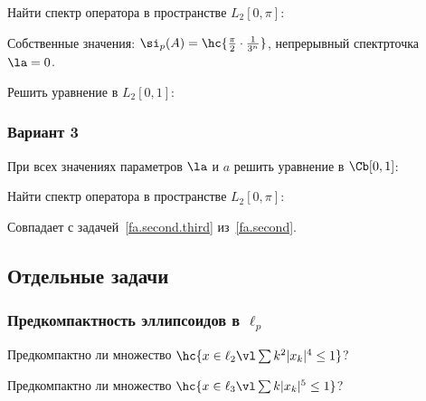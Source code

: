 \documentclass[a4paper]{article}
\begin{document}
\begin{problem}
Найти спектр оператора в пространстве $L_2[0,\pi]$:
\end{problem}
\begin{answer}
Собственные значения: $\si_p(A) = \hc{\frac\pi2\cdot \frac{1}{3^n}}$, непрерывный спектр\т точка $\la = 0$.
\end{answer}
\begin{problem}\label{fa.second.third}
Решить уравнение в $L_2[0,1]$:
\end{problem}


\subsubsection{Вариант 3}
\setcounter{problem}{0}
\begin{problem}
При всех значениях параметров $\la$ и $a$ решить уравнение в $\Cb[0,1]$:
\end{problem}

\begin{problem}
Найти спектр оператора в пространстве $L_2[0,\pi]$:
\end{problem}

\begin{problem}
Совпадает с задачей~\ref{fa.second.third} из~\ref{fa.second}.
\end{problem}

\subsection{Отдельные задачи}

\setcounter{problem}{0}

\subsubsection{Предкомпактность эллипсоидов в $\ell_p$}

\begin{problem}
Предкомпактно ли множество $\hc{x \in \ell_2 \vl \sum k^2|x_k|^4 \le 1}$?
\end{problem}

\begin{problem}
Предкомпактно ли множество $\hc{x \in \ell_3 \vl \sum k|x_k|^5 \le 1}$?
\end{problem}
\end{document}
